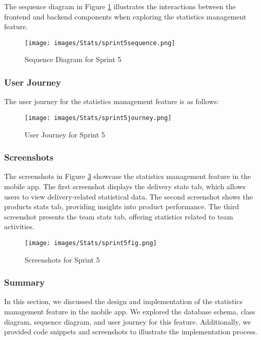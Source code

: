 The sequence diagram in Figure \ref{fig:sequence_sprint5} illustrates the interactions between the frontend and backend components when exploring the statistics management feature.

\begin{figure}[H]
    \centering
    \texttt{[image: images/Stats/sprint5sequence.png]}
    \caption{Sequence Diagram for Sprint 5}
    \label{fig:sequence_sprint5}
\end{figure}

\subsubsection{User Journey}

The user journey for the statistics management feature is as follows:

\begin{figure}[H]
    \centering
    \texttt{[image: images/Stats/sprint5journey.png]}
    \caption{User Journey for Sprint 5}
    \label{fig:activity_sprint5}
\end{figure}

\subsubsection{Screenshots}

The screenshots in Figure \ref{fig:screenshots_sprint5} showcase the statistics management feature in the mobile app. The first screenshot displays the delivery stats tab, which allows users to view delivery-related statistical data. The second screenshot shows the products stats tab, providing insights into product performance. The third screenshot presents the team stats tab, offering statistics related to team activities.

\begin{figure}[H]
    \centering
    \texttt{[image: images/Stats/sprint5fig.png]}
    \caption{Screenshots for Sprint 5}
    \label{fig:screenshots_sprint5}
\end{figure}

\subsubsection{Summary}

In this section, we discussed the design and implementation of the statistics management feature in the mobile app. We explored the database schema, class diagram, sequence diagram, and user journey for this feature. Additionally, we provided code snippets and screenshots to illustrate the implementation process.

